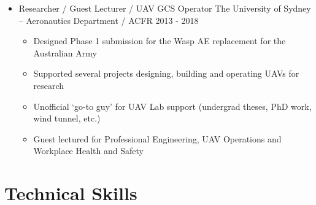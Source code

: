 \documentclass[12pt,letter,sans]{moderncv}
\begin{document}
\begin{itemize}
\item{\cventry
    {}
    {Researcher / Guest Lecturer / UAV GCS Operator}
    {The University of Sydney – Aeronautics Department / ACFR}
    {2013 - 2018}
    {}
    {
        \vspace{3pt} 
        \begin{itemize}
            \item Designed Phase 1 submission for the Wasp AE replacement for the Australian Army
            \item Supported several projects designing, building and operating UAVs for research  
            \item Unofficial `go-to guy' for UAV Lab support (undergrad theses, PhD work, wind tunnel, etc.)
            \item Guest lectured for Professional Engineering, UAV Operations and Workplace Health and Safety
        \end{itemize}
        }
    }

%
\end{itemize}

\vspace{4pt}


\section{Technical Skills}
\vspace{4pt}
\end{document}
